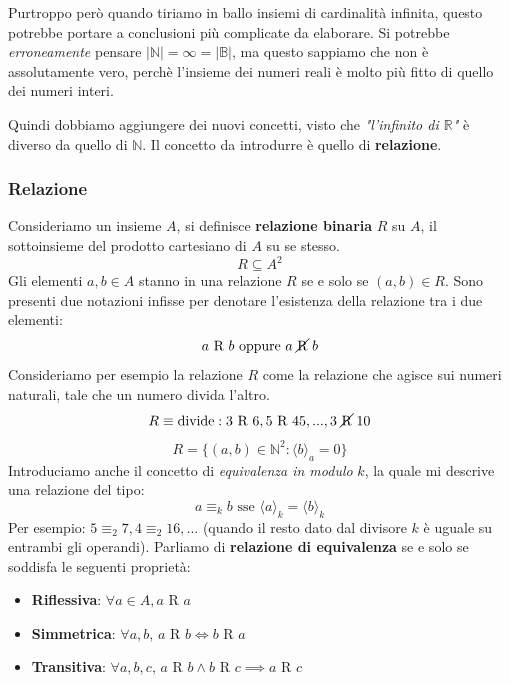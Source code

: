 \documentclass{article}
\begin{document}
Purtroppo però quando tiriamo in ballo insiemi di cardinalità infinita, questo potrebbe
portare a conclusioni più complicate da elaborare. Si potrebbe \textit{erroneamente}
pensare $|\mathbb{N}|=\infty=|\mathbb{B}|$, ma questo sappiamo che
non è assolutamente vero, perchè l'insieme dei numeri reali è molto più fitto
di quello dei numeri interi.

Quindi dobbiamo aggiungere dei nuovi concetti, visto che \textit{"l'infinito di $\mathbb{R}$"} è
diverso da quello di $\mathbb{N}$. Il concetto da introdurre è quello di \textbf{relazione}.

\subsubsection{Relazione}
Consideriamo un insieme $A$, si definisce \textbf{relazione binaria} $R$ su $A$,
il sottoinsieme del prodotto cartesiano di $A$ su se stesso.
$$R\subseteq A^2$$
Gli elementi $a,b\in A$ stanno in una relazione $R$ se e solo se $(a,b)\in R$. Sono
presenti due notazioni infisse per denotare l'esistenza della relazione tra i due
elementi:
$$a\text{ R }b \text{ oppure } a\text{ \cancel{R} }b$$
Consideriamo per esempio la relazione $R$ come la relazione che agisce sui numeri naturali,
tale che un numero divida l'altro.
$$R\equiv \text{divide}: 3\text{ R }6, 5\text{ R }45, ...,3\text{ \cancel{R} }10$$
$$R=\{(a,b)\in\mathbb{N}^2:\langle b\rangle_a=0\}$$
Introduciamo anche il concetto di \textit{equivalenza in modulo} $k$, la quale mi
descrive una relazione del tipo:
$$a\equiv_k b \text{ sse } \langle a\rangle_k =\langle b\rangle_k$$
Per esempio: $5\equiv_2 7, 4\equiv_2 16,...$ (quando il resto dato dal divisore $k$ è
uguale su entrambi gli operandi).
\newline
Parliamo di \textbf{relazione di equivalenza} se e solo se soddisfa le seguenti
proprietà:
\begin{itemize}
    \item \textbf{Riflessiva}: $\forall a\in A, a\text{ R }a$
    \item \textbf{Simmetrica}: $\forall a,b\text{, } a\text{ R }b \Leftrightarrow b\text{ R }a$
    \item \textbf{Transitiva}: $\forall a,b,c\text{, }a\text{ R }b\land b\text{ R }c\implies a\text{ R }c$
\end{itemize}
\end{document}
